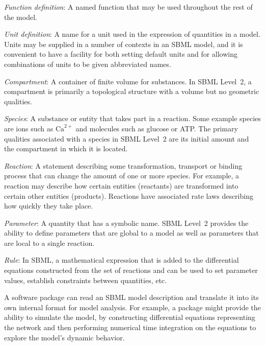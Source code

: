 \documentclass[10pt,twocolumntoc]{cekarticle}
\begin{document}
\begin{description}

\item \emph{Function definition}: A named function that may be used
  throughout the rest of the model.
    
\item \emph{Unit definition}: A name for a unit used in the expression of
  quantities in a model.  Units may be supplied in a number of contexts in
  an SBML model, and it is convenient to have a facility for both setting
  default units and for allowing combinations of units to be given
  abbreviated names.

\item \emph{Compartment}: A container of finite volume for substances.  In
  SBML Level~2, a compartment is primarily a topological structure with a
  volume but no geometric qualities.
  
\item \emph{Species}: A substance or entity that takes part in a reaction.
  Some example species are ions such as $\text{Ca}^{2+}$ and molecules
  such as glucose or ATP.  The primary qualities associated with a species
  in SBML Level~2 are its initial amount and the compartment in which it is
  located.

\item \emph{Reaction}: A statement describing some transformation,
  transport or binding process that can change the amount of one or more
  species.  For example, a reaction may describe how certain entities
  (reactants) are transformed into certain other entities (products).
  Reactions have associated rate laws describing how quickly they take
  place.
  
\item \emph{Parameter}: A quantity that has a symbolic name.  SBML Level~2
  provides the ability to define parameters that are global to a model as
  well as parameters that are local to a single reaction.

\item \emph{Rule}: In SBML, a mathematical expression that is added
  to the differential equations constructed from the set of reactions and
  can be used to set parameter values, establish constraints between
  quantities, etc.

\end{description}

A software package can read an SBML model description and translate it
into its own internal format for model analysis.  For example, a package
might provide the ability to simulate the model, by constructing
differential equations representing the network and then performing
numerical time integration on the equations to explore the model's dynamic
behavior.
\end{document}
